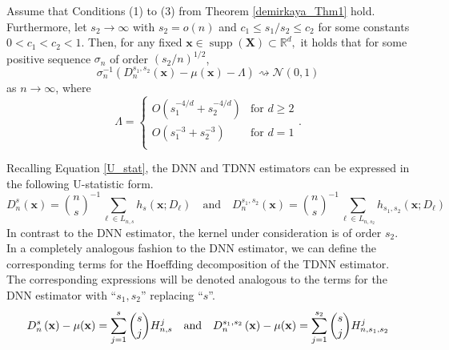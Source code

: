 \documentclass[letterpaper,10pt]{article}
\numberwithin{equation}{section}
\numberwithin{theorem}{section}
\theoremstyle{definition}
\newcommand{\1}{\mathbb{1}}
\begin{document}
\vspace{0.5cm}
\begin{theorem}\label{demirkaya_Thm3}
	Assume that Conditions (1) to (3) from Theorem \ref{demirkaya_Thm1} hold.
	Furthermore, let $s_2 \rightarrow \infty$ with $s_2 = o(n)$ and $c_1 \leq s_1/s_2 \leq c_2$ for some constants $0 < c_1 < c_2 < 1$.
	Then, for any fixed $\mathbf{x} \in \operatorname{supp}(\mathbf{X}) \subset \mathbb{R}^d,$ it holds that for some positive sequence $\sigma_n$ of order $(s_2/n)^{1/2}$,
	\begin{equation}
		\sigma_n^{-1} \left(D_{n}^{s_1, s_2}\left(\mathbf{x}\right) - \mu(\mathbf{x}) - \Lambda\right) \rightsquigarrow \mathcal{N}(0,1)
	\end{equation}
	as $n \rightarrow \infty$, where
	\begin{equation*}
		\Lambda = \begin{cases}
			O\left(s_1^{-4/d} + s_2^{-4/d}\right) & \text{for } d \geq 2 \\
			O\left(s_1^{-3} + s_2^{-3}\right)     & \text{for } d = 1    \\
		\end{cases}.
	\end{equation*}
\end{theorem}
Recalling Equation \ref{U_stat}, the DNN and TDNN estimators can be expressed in the following U-statistic form.
\begin{equation}
	D_{n}^{s}(\mathbf{x})
	= \binom{n}{s}^{-1} \sum_{\ell \in L_{n,s}} h_{s}(\mathbf{x}; D_{\ell})
	\quad \text{and} \quad
	D_{n}^{s_1, s_2}(\mathbf{x})
	= \binom{n}{s}^{-1} \sum_{\ell \in L_{n,s_2}} h_{s_1, s_2}(\mathbf{x}; D_{\ell})
\end{equation}
In contrast to the DNN estimator, the kernel under consideration is of order $s_2$.
In a completely analogous fashion to the DNN estimator, we can define the corresponding terms for the Hoeffding decomposition of the TDNN estimator.
The corresponding expressions will be denoted analogous to the terms for the DNN estimator with ``$s_1, s_2$'' replacing ``$s$''.
\begin{equation}
	D_n^s\left(\mathbf{x}\right) - \mu(\mathbf{x})
	= \sum_{j = 1}^{s}\binom{s}{j}H_{n,s}^{j}\\
	\quad \text{and} \quad
	D_n^{s_1,s_2}\left(\mathbf{x}\right) - \mu(\mathbf{x})
	= \sum_{j = 1}^{s_2}\binom{s}{j}H_{n,s_1, s_2}^{j}
\end{equation}

\newpage
\end{document}
